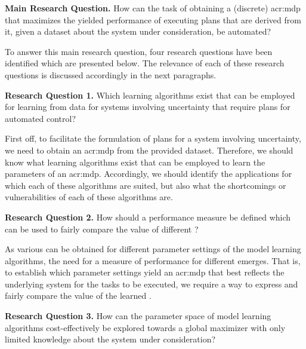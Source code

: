 \vspace{12pt}
\noindent%
\textbf{Main Research Question.} How can the task of obtaining a (discrete) \acrshort{acr:mdp} that maximizes the yielded performance of executing plans that are derived from it, given a dataset about the system under consideration, be automated?
\vspace{12pt}

To answer this main research question, four research questions have been identified which are presented below.
The relevance of each of these research questions is discussed accordingly in the next paragraphs.

\vspace{16pt}
\noindent%
\textbf{Research Question 1.} Which learning algorithms exist that can be employed for learning  from data for systems involving uncertainty that require plans for automated control?
\vspace{0pt}

First off, to facilitate the formulation of plans for a system involving uncertainty, we need to obtain an \acrshort{acr:mdp} from the provided dataset.
Therefore, we should know what learning algorithms exist that can be employed to learn the parameters of an \acrshort{acr:mdp}.
Accordingly, we should identify the applications for which each of these algorithms are suited, but also what the shortcomings or vulnerabilities of each of these algorithms are.

\vspace{16pt}
\noindent%
\textbf{Research Question 2.} How should a performance measure be defined which can be used to fairly compare the value of different ?
\vspace{12pt}

As various  can be obtained for different parameter settings of the model learning algorithms, the need for a measure of performance for different  emerges.
That is, to establish which parameter settings yield an \acrshort{acr:mdp} that best reflects the underlying system for the tasks to be executed, we require a way to express and fairly compare the value of the learned .

\vspace{16pt}
\noindent%
\textbf{Research Question 3.} How can the parameter space of model learning algorithms cost-effectively be explored towards a global maximizer with only limited knowledge about the system under consideration?
\vspace{12pt}


